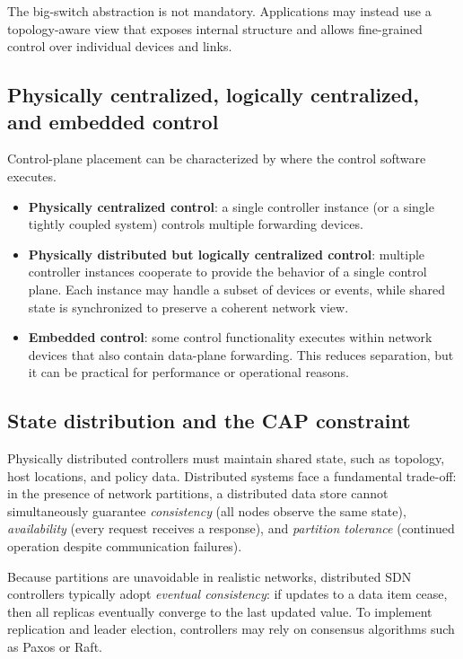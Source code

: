 \documentclass[11pt,a4paper,openany]{report}
\begin{document}
The big-switch abstraction is not mandatory. Applications may instead use a topology-aware view that exposes internal structure and allows fine-grained control over individual devices and links.

\subsection{Physically centralized, logically centralized, and embedded control}

Control-plane placement can be characterized by where the control software executes.

\begin{itemize}
\item \textbf{Physically centralized control}: a single controller instance (or a single tightly coupled system) controls multiple forwarding devices.
\item \textbf{Physically distributed but logically centralized control}: multiple controller instances cooperate to provide the behavior of a single control plane. Each instance may handle a subset of devices or events, while shared state is synchronized to preserve a coherent network view.
\item \textbf{Embedded control}: some control functionality executes within network devices that also contain data-plane forwarding. This reduces separation, but it can be practical for performance or operational reasons.
\end{itemize}

\subsection{State distribution and the CAP constraint}

Physically distributed controllers must maintain shared state, such as topology, host locations, and policy data. Distributed systems face a fundamental trade-off: in the presence of network partitions, a distributed data store cannot simultaneously guarantee \emph{consistency} (all nodes observe the same state), \emph{availability} (every request receives a response), and \emph{partition tolerance} (continued operation despite communication failures).

Because partitions are unavoidable in realistic networks, distributed SDN controllers typically adopt \emph{eventual consistency}: if updates to a data item cease, then all replicas eventually converge to the last updated value. To implement replication and leader election, controllers may rely on consensus algorithms such as Paxos or Raft.
\end{document}
